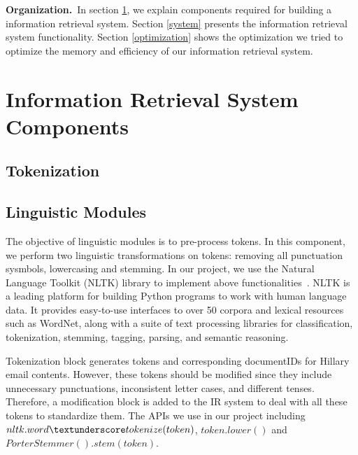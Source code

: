 \documentclass[journal]{IEEEtran}
\begin{document}
\textbf{Organization.}~In section \ref{components}, we explain components required for building a information retrieval system. Section \ref{system} presents the information retrieval system functionality. Section \ref{optimization} shows the optimization we tried to optimize the memory and efficiency of our information retrieval system.

\section{Information Retrieval System Components}\label{components}
\subsection{Tokenization}

\subsection{Linguistic Modules}

The objective of linguistic modules is to pre-process tokens. In this component, we perform two linguistic transformations on tokens: removing all punctuation sysmbols, lowercasing and stemming. In our project, we use the Natural Language Toolkit (NLTK) library to implement above functionalities~\cite{Loper02nltk:the}. 
NLTK is a leading platform for building Python programs to work with human language data. It provides easy-to-use interfaces to over 50 corpora and lexical resources such as WordNet, along with a suite of text processing libraries for classification, tokenization, stemming, tagging, parsing, and semantic reasoning.

Tokenization block generates tokens and corresponding documentIDs for Hillary email contents. However, these tokens should be modified since they include unnecessary punctuations, inconsistent letter cases, and different tenses. Therefore, a modification block is added to the IR system to deal with all these tokens to standardize them.
The APIs we use in our project including $nltk.word\textunderscore tokenize(token)$, $token.lower()$ and $PorterStemmer().stem(token)$.
\end{document}
